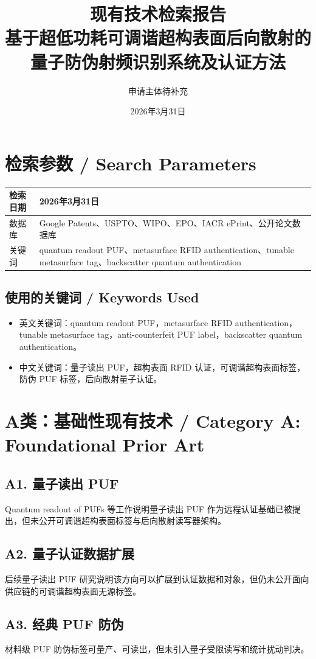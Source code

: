 ﻿\documentclass[12pt,a4paper]{article}
\title{\textbf{现有技术检索报告}\\[0.5em]\Large 基于超低功耗可调谐超构表面后向散射的量子防伪射频识别系统及认证方法}
\author{申请主体待补充}
\date{2026年3月31日}
\begin{document}
\maketitle
\tableofcontents
\newpage
\section{检索参数 / Search Parameters}
\begin{tabular}{|p{4cm}|p{9cm}|}
\hline
检索日期 & 2026年3月31日 \\
\hline
数据库 & Google Patents、USPTO、WIPO、EPO、IACR ePrint、公开论文数据库 \\
\hline
关键词 & quantum readout PUF、metasurface RFID authentication、tunable metasurface tag、backscatter quantum authentication \\
\hline
\end{tabular}

\subsection{使用的关键词 / Keywords Used}
\begin{itemize}
\item 英文关键词：quantum readout PUF，metasurface RFID authentication，tunable metasurface tag，anti-counterfeit PUF label，backscatter quantum authentication。
\item 中文关键词：量子读出 PUF，超构表面 RFID 认证，可调谐超构表面标签，防伪 PUF 标签，后向散射量子认证。
\end{itemize}

\section{A类：基础性现有技术 / Category A: Foundational Prior Art}
\subsection{A1. 量子读出 PUF}
Quantum readout of PUFs 等工作说明量子读出 PUF 作为远程认证基础已被提出，但未公开可调谐超构表面标签与后向散射读写器架构。

\subsection{A2. 量子认证数据扩展}
后续量子读出 PUF 研究说明该方向可以扩展到认证数据和对象，但仍未公开面向供应链的可调谐超构表面无源标签。

\subsection{A3. 经典 PUF 防伪}
材料级 PUF 防伪标签可量产、可读出，但未引入量子受限读写和统计扰动判决。
\end{document}
